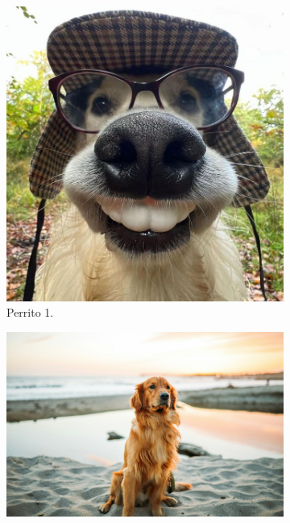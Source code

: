 \documentclass[12pt]{article}
\begin{document}
\begin{figure}
     \centering
     \begin{subfigure}[b]{0.3\textwidth}
         \centering
         \includegraphics[width=\textwidth]{dog1.jpg}
         \caption{Perrito 1.}
         \label{fig:a}
     \end{subfigure}
     \hfill
     \begin{subfigure}[b]{0.3\textwidth}
         \centering
         \includegraphics[width=\textwidth]{dog2.jpeg}

\end{subfigure}
\end{figure}
\end{document}
